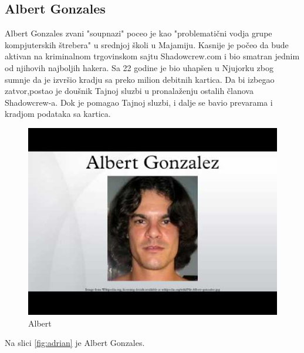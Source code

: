 \documentclass[a4paper]{article}
\begin{document}
\subsection{Albert Gonzales}
Albert Gonzales zvani "soupnazi" poceo je kao "problematični vodja grupe kompjuterskih štrebera" u srednjoj školi u Majamiju. Kasnije je počeo da bude aktivan na kriminalnom trgovinskom sajtu Shadowcrew.com i bio smatran jednim od njihovih najboljih hakera. Sa 22 godine je bio uhapšen u Njujorku zbog sumnje da je izvršio kradju sa preko milion debitnih kartica. Da bi izbegao zatvor,postao je doušnik Tajnoj sluzbi u pronalaženju ostalih članova Shadowcrew-a. Dok je pomagao Tajnoj sluzbi, i dalje se bavio prevarama i kradjom podataka sa kartica.
\begin{figure}[h!]
	\begin{center}
		\includegraphics[scale=0.25]{albert.jpg}
	\end{center}
	\caption{Albert}
	\label{fig:albert}
\end{figure}

Na slici \ref{fig:adrian} je Albert Gonzales.
\end{document}
